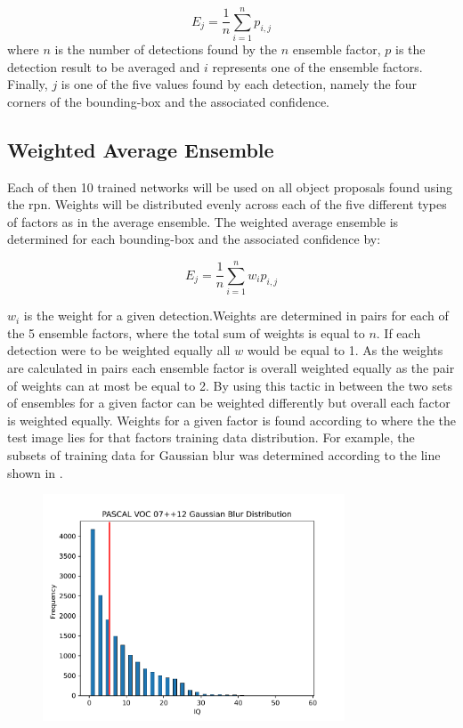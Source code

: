 \begin{equation}
  E_{j} = \frac{1}{n} \sum_{i=1}^{n} p_{i,j} 
\end{equation}
where $n$ is the number of detections found by the $n$ ensemble factor, $p$ is the detection result to be averaged and $i$ represents one of the ensemble factors. Finally, $j$ is one of the five values found by each detection, namely the four corners of the bounding-box and the associated confidence.


\subsection{Weighted Average Ensemble}
Each of then 10 trained networks will be used on all object proposals found using the \gls{rpn}. Weights will be distributed evenly across each of the five different types of factors as in the average ensemble. The weighted average ensemble is determined for each bounding-box and the associated confidence by:

\begin{equation}
	E_{j} = \frac{1}{n} \sum_{i=1}^{n} w_ip_{i,j} 
\end{equation}

$w_i$ is the weight for a given detection.Weights are determined in pairs for each of the 5 ensemble factors, where the total sum of weights is equal to $n$. If each detection were to be weighted equally all $w$ would be equal to 1. As the weights are calculated in pairs each ensemble factor is overall weighted equally as the pair of weights can at most be equal to 2. By using this tactic in between the two sets of ensembles for a given factor can be weighted differently but overall each factor is weighted equally.
Weights for a given factor is found according to where the the test image lies for that factors training data distribution. For example, the subsets of training data for Gaussian blur was determined according to the line shown in . 

\begin{figure}[H]
  \centering
    \includegraphics[width=0.8\textwidth]{Figs/Implementation/GaussianBlurdistred.pdf}
      \caption{}
    \label{fig:blur_dist}
\end{figure}

